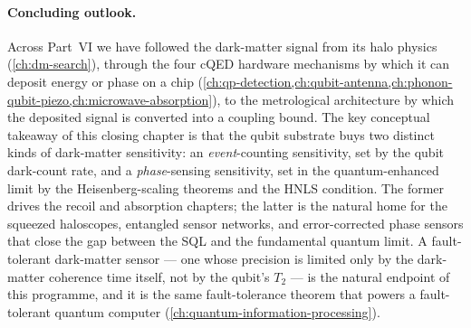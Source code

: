 \paragraph{Concluding outlook.}
Across Part~VI we have followed the dark-matter signal from
its halo physics (\cref{ch:dm-search}), through the
four cQED hardware mechanisms by which it can deposit energy
or phase on a chip
(\cref{ch:qp-detection,ch:qubit-antenna,ch:phonon-qubit-piezo,ch:microwave-absorption}),
to the metrological architecture by which the deposited signal
is converted into a coupling bound. The key conceptual
takeaway of this closing chapter is that the qubit substrate
buys two distinct kinds of dark-matter sensitivity: an
\emph{event}-counting sensitivity, set by the qubit dark-count
rate, and a \emph{phase}-sensing sensitivity, set in the
quantum-enhanced limit by the Heisenberg-scaling theorems and
the HNLS condition. The former drives the recoil and absorption
chapters; the latter is the natural home for the squeezed
haloscopes, entangled sensor networks, and error-corrected
phase sensors that close the gap between the SQL and the
fundamental quantum limit. A fault-tolerant
dark-matter sensor --- one whose precision is limited only by
the dark-matter coherence time itself, not by the qubit's
$T_2$ --- is the natural endpoint of this programme, and
it is the same fault-tolerance theorem that powers a
fault-tolerant quantum computer
(\cref{ch:quantum-information-processing}).
